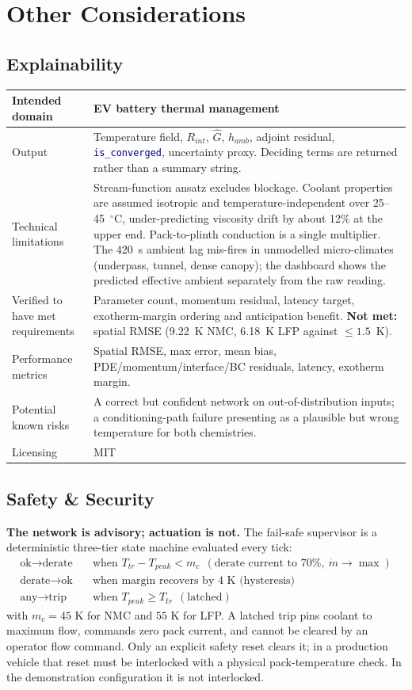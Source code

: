 \documentclass[10.5pt,a4paper]{article}
\newcommand{\code}[1]{\texttt{\textcolor{navy}{#1}}}
\begin{document}
\section*{Other Considerations}
\subsection*{Explainability}
\begin{tabularx}{\linewidth}{@{}KV@{}}
\toprule
Intended domain & EV battery thermal management \\
\midrule
Output & Temperature field, $R_{int}$, $\hat G$, $h_{amb}$, adjoint residual, \code{is\_converged}, uncertainty proxy. Deciding terms are returned rather than a summary string. \\
\midrule
Technical limitations & Stream-function ansatz excludes blockage. Coolant properties are assumed isotropic and temperature-independent over 25--45~$^\circ$C, under-predicting viscosity drift by about 12\% at the upper end. Pack-to-plinth conduction is a single multiplier. The 420~s ambient lag mis-fires in unmodelled micro-climates (underpass, tunnel, dense canopy); the dashboard shows the predicted effective ambient separately from the raw reading. \\
\midrule
Verified to have met requirements & Parameter count, momentum residual, latency target, exotherm-margin ordering and anticipation benefit. \textcolor{bad}{\textbf{Not met:}} spatial RMSE (9.22~K NMC, 6.18~K LFP against $\le 1.5$~K). \\
\midrule
Performance metrics & Spatial RMSE, max error, mean bias, PDE/momentum/interface/BC residuals, latency, exotherm margin. \\
\midrule
Potential known risks & A correct but confident network on out-of-distribution inputs; a conditioning-path failure presenting as a plausible but wrong temperature for both chemistries. \\
\midrule
Licensing & MIT \\
\bottomrule
\end{tabularx}

\subsection*{Safety \& Security}
\textbf{The network is advisory; actuation is not.} The fail-safe supervisor is a deterministic three-tier state machine evaluated every tick:
\begin{align*}
  \text{ok}\to\text{derate} &\quad\text{when } T_{tr}-T_{peak}<m_c \ \ (\text{derate current to }70\%,\ \dot m\to\max)\\
  \text{derate}\to\text{ok} &\quad\text{when margin recovers by 4 K (hysteresis)}\\
  \text{any}\to\text{trip} &\quad\text{when } T_{peak}\ge T_{tr}\ \ (\text{latched})
\end{align*}
with $m_c=45$ K for NMC and $55$ K for LFP. A latched trip pins coolant to maximum flow, commands zero pack current, and cannot be cleared by an operator flow command. Only an explicit safety reset clears it; in a production vehicle that reset must be interlocked with a physical pack-temperature check. In the demonstration configuration it is not interlocked.
\end{document}

